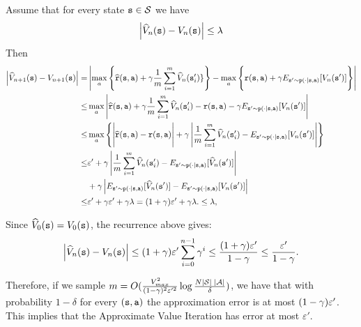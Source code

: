 Assume that for every state ${\tt s} \in \mathcal{S}$  we have
\[
\left|\widehat{V}_n({\tt s}) - V_n({\tt s})\right|\leq \lambda
\]
Then
\begin{align*}
\left|\widehat{V}_{n+1}(\state)-V_{n+1}(\state)\right| =&
\left|\max_a\left\{\widehat{\reward}(\state,\action)+\discount
\frac{1}{m}\sum_{i=1}^m \widehat{V}_n(\state'_i)\}\right\} 
- \max_a 
\Bigg\{
\reward(\state,\action)+\discount E_{\state'\sim \transitionprob(\cdot
|\state,\action)} [V_n(\state')] 
\Bigg\}
\right|\\
\leq& \max_a\left|\widehat{\reward}(\state,\action)+\discount
\frac{1}{m}\sum_{i=1}^m \widehat{V}_n(\state'_i) - 
\reward(\state,\action)-\discount E_{\state'\sim \transitionprob(\cdot
|\state,\action)} [V_n(\state')] \right|\\
\leq& \max_a \left\{\Bigg|\widehat{\reward}(\state,\action)- \reward(\state,\action)\Bigg|
+\discount \left| \frac{1}{m}\sum_{i=1}^m \widehat{V}_n(\state'_i) -
E_{\state'\sim \transitionprob(\cdot
|\state,\action)} [V_n(\state')] \right| \right\}\\
%
\leq & \varepsilon' + \discount \left| \frac{1}{m}\sum_{i=1}^m \widehat{V}_n(\state'_i) -
E_{\state'\sim \transitionprob(\cdot
|\state,\action)} [\widehat{V}_n(\state')] \right| \\
&+ \discount \left| E_{\state'\sim \transitionprob(\cdot
|\state,\action)} [\widehat{V}_n(\state')] -
E_{\state'\sim \transitionprob(\cdot
|\state,\action)} [V_n(\state')] \right|\\
 \leq & \varepsilon'+\discount\varepsilon' +\discount\lambda = (1+\discount)\varepsilon' +\discount\lambda.
 \leq \lambda,
\end{align*}

Since $\widehat{V}_0({\tt s}) = V_0({\tt s})$, the recurrence above gives:
\[
\left|\widehat{V}_n({\tt s}) - V_n({\tt s})\right|\leq (1+\gamma)\varepsilon'\sum_{i=0}^{n-1}\gamma^i \leq \frac{(1+\gamma)\varepsilon'}{1-\gamma} \leq \frac{\varepsilon'}{1-\gamma}.
\]

Therefore, if we sample $m=O(\frac{V^2_{max}}{(1-\gamma)^2\varepsilon'^2}\log \frac{N
|\mathcal{S}| \;|\mathcal{A}|}{\delta})$, we have that with probability
$1-\delta$ for every $({\tt s},{\tt a})$ the approximation error is
at most $(1-\gamma)\varepsilon'$. This implies that the Approximate Value
Iteration has error at most $\varepsilon'$.



